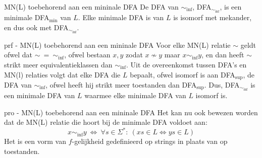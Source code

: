 \newpage

\begin{lem}{ MN(L) toebehorend aan een mininale DFA}
    \vspace{-0.1cm}
    De DFA van $\sim_{\text{inf}}$, DFA$_{\sim_{\text{inf}}}$, is een minimale DFA$_{\text{min}}$ van $L$. Elke minimale DFA is van $L$ is isomorf met mekander, en dus ook met DFA$_{\sim_{\text{inf}}}$.
    \vspace{-0.1cm}
\end{lem}

\begin{prf}{prf - MN(L) toebehorend aan een mininale DFA}
    \vspace{-0.1cm}
    Voor elke MN(L) relatie $\sim$ geldt ofwel dat $\sim \ = \ \sim_{\text{inf}}$, ofwel bestaan $x,y$ zodat $x \nsim y$ maar $x \sim_{\text{inf}} y$, en dan heeft $\sim$ strikt meer equivalentieklassen dan $\sim_{\text{inf}}$. Uit de overeenkomst tussen DFA's en MN(l) relaties volgt dat elke DFA die $L$ bepaalt, ofwel isomorf is aan DFA$_{\text{sup}}$, de DFA van $\sim_{\text{inf}}$, ofwel heeft hij strikt meer toestanden dan DFA$_{\text{sup}}$. Dus, DFA$_{\sim_{\text{inf}}}$ is een minimale DFA van $L$ waarmee elke minimale DFA van $L$ isomorf is.
\end{prf}

\begin{pro}{pro - MN(L) toebehorend aan een mininale DFA}
    \vspace{-0.1cm}
    Het kan nu ook bewezen worden dat de MN(L) relatie die hoort bij de minimale DFA voldoet aan:
    \begin{equation*}
        x \sim_{\text{inf}} y \ \Leftrightarrow \  \forall s \in \Sigma^*: \ ( xs \in L \Leftrightarrow ys \in L )
    \end{equation*}
    Het is een vorm van $f$-gelijkheid gedefinieerd op strings in plaats van op toestanden.
\end{pro}

